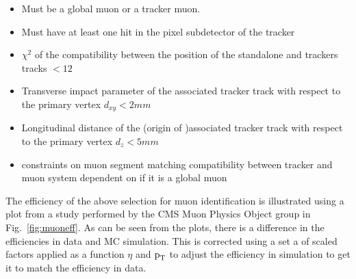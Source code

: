\begin{itemize}
\item Must be a global muon or a tracker muon.
\item Must have at least one hit in the pixel subdetector of the tracker
\item $\chi^2$ of the compatibility between the position of the standalone and trackers tracks $<12$
\item Transverse impact parameter of the associated tracker track with respect to the primary vertex $d_{xy}< 2 mm$
\item Longitudinal distance of the (origin of )associated tracker track with respect to the primary vertex $d_z <5 mm$
\item constraints on muon segment matching compatibility between tracker and muon system dependent on if it is a global muon
\end{itemize}
The efficiency of the above selection for muon identification is illustrated using a plot from a study performed by the CMS Muon Physics Object group in Fig.~\ref{fig:muoneff}. As can be seen from the plots, there is a difference in the efficiencies in data and MC simulation. This is corrected using a set a of scaled factors applied as a function $\eta$ and $\text{p}_\text{T}$ to adjust the efficiency in simulation to get it to match the efficiency in data.  


